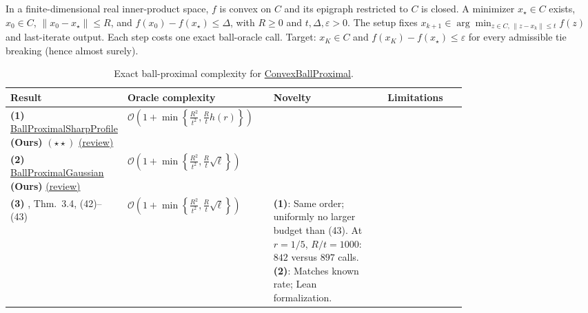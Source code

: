 \begin{table}[tp]
\centering
\caption{Exact ball-proximal complexity for \href{https://github.com/k3nfalt/longtails/blob/main/LongTails/Setups/ConvexBallProximal.lean}{ConvexBallProximal}.}\label{tab:ConvexBallProximal}
\parbox{\linewidth}{\footnotesize In a finite-dimensional real inner-product space, $f$ is convex on $C$ and its epigraph restricted to $C$ is closed. A minimizer $x_\star\in C$ exists, $x_0\in C$, $\|x_0-x_\star\|\le R$, and $f(x_0)-f(x_\star)\le\Delta$, with $R\ge0$ and $t,\Delta,\varepsilon>0$. The setup fixes $x_{k+1}\in\arg\min_{z\in C,\,\|z-x_k\|\le t}f(z)$ and last-iterate output. Each step costs one exact ball-oracle call. Target: $x_K\in C$ and $f(x_K)-f(x_\star)\le\varepsilon$ for every admissible tie breaking (hence almost surely).}\par\smallskip
\begin{threeparttable}
\footnotesize
\setlength{\tabcolsep}{4pt}\renewcommand{\arraystretch}{1.25}
\begin{tabularx}{\linewidth}{@{}>{\raggedright\arraybackslash}p{0.20\linewidth}>{\raggedright\arraybackslash}p{0.32\linewidth}>{\raggedright\arraybackslash}p{0.25\linewidth}>{\raggedright\arraybackslash}X@{}}
\toprule
\textbf{Result} & \textbf{Oracle complexity} & \textbf{Novelty} & \textbf{Limitations} \\
\midrule
\textbf{(1)} \href{https://github.com/k3nfalt/longtails/blob/main/LongTails/Theorems/BallProximalSharpProfile.lean}{Ball\allowbreak Proximal\allowbreak Sharp\allowbreak Profile} \textbf{(Ours)} $(\star\star)$ \href{https://github.com/k3nfalt/longtails/blob/main/scripts/reviews/BallProximalSharpProfile.md}{(review)} & $\mathcal{O}\!\left(1+\min\!\left\{\frac{R^2}{t^2},\frac Rt h(r)\right\}\right)$ & & \\
\midrule
\textbf{(2)} \href{https://github.com/k3nfalt/longtails/blob/main/LongTails/Theorems/BallProximalGaussian.lean}{Ball\allowbreak Proximal\allowbreak Gaussian} \textbf{(Ours)} \href{https://github.com/k3nfalt/longtails/blob/main/scripts/reviews/BallProximalGaussian.md}{(review)} & $\mathcal{O}\!\left(1+\min\!\left\{\frac{R^2}{t^2},\frac Rt \sqrt\ell\right\}\right)$ & & \\
\midrule[1.2pt]
\textbf{(3)} \citep{RichtarikLi2026BallV1}, Thm.~3.4, (42)--(43)
& $\mathcal{O}\!\left(1+\min\!\left\{\frac{R^2}{t^2},\frac Rt\sqrt\ell\right\}\right)$
& \textbf{(1)}: Same order; uniformly no larger budget than (43). At $r=1/5$, $R/t=1000$: $842$ versus $897$ calls. \textbf{(2)}: Matches known rate; Lean formalization.

\end{tabularx}
\end{threeparttable}
\end{table}
